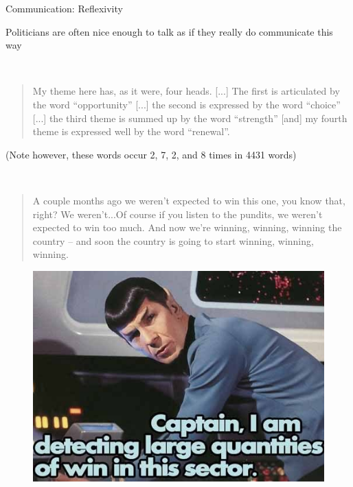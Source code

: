 \documentclass{hertieteaching}\usepackage[]{graphicx}\usepackage[]{color}
\begin{document}
\begin{frame}{Communication: Reflexivity}

Politicians are often nice enough to talk as if they really do
communicate this way

~\\
\begin{quotation}
\noindent
My theme here has, as it were, four heads. [...] The first is
articulated by the word ``opportunity'' [...] the second is expressed
by the word ``choice'' [...] the third theme is summed up by the word
``strength'' [and] my fourth theme is expressed well by the word
``renewal''.
\end{quotation}

(Note however, these words occur 2, 7, 2, and 8 times in 4431 words)

\pause

~\\
\begin{quotation}
\noindent
A couple months ago we weren't expected to win this one, you know
that, right? We weren't...Of course if you listen to the pundits, we
weren't expected to win too much. And now we're winning, winning,
winning the country -- and soon the country is going to start winning,
winning, winning.
\end{quotation}


\end{frame}
\begin{frame}{}

\begin{center}
\begin{figure}[hbt]
  \includegraphics[scale=0.6]{pictures/spock-detecting-large-quantities-sf.jpg}
\end{figure}
\end{center}

\end{frame}
\end{document}
